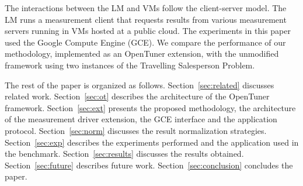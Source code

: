 The interactions between the LM and VMs follow the
client-server model. The LM runs a measurement client that requests
results from various measurement servers running in VMs hosted at
a public cloud. The experiments in this paper used the Google Compute Engine
(GCE).  We compare the performance of our methodology, implemented as an
OpenTuner extension, with the unmodified framework using two instances of the
Travelling Salesperson Problem.

The rest of the paper is organized as follows.
Section~\ref{sec:related} discusses related work.
Section~\ref{sec:ot} describes the architecture of the OpenTuner framework.
Section~\ref{sec:ext} presents the proposed methodology, the architecture of
the measurement driver extension, the GCE interface and the application
protocol.
Section~\ref{sec:norm} discusses the result normalization strategies.
Section~\ref{sec:exp} describes the experiments performed and the
application used in the benchmark.
Section~\ref{sec:results} discusses the results obtained.
Section~\ref{sec:future} describes future work.
Section~\ref{sec:conclusion} concludes the paper.
